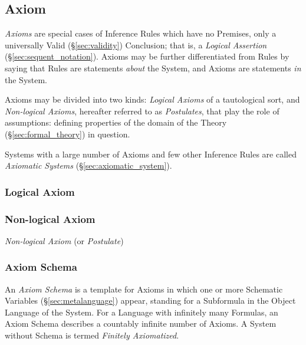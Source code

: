 \subsection{Axiom}\label{sec:axiom}

\emph{Axioms} are special cases of Inference Rules which have no
Premises, only a universally Valid (\S\ref{sec:validity}) Conclusion;
that is, a \emph{Logical Assertion} (\S\ref{sec:sequent_notation}).
Axioms may be further differentiated from Rules by saying that Rules
are statements \emph{about} the System, and Axioms are statements
\emph{in} the System.

Axioms may be divided into two kinds: \emph{Logical Axioms} of a
tautological sort, and \emph{Non-logical Axioms}, hereafter referred
to as \emph{Postulates}, that play the role of assumptions: defining
properties of the domain of the Theory (\S\ref{sec:formal_theory}) in
question.

Systems with a large number of Axioms and few other Inference Rules
are called \emph{Axiomatic Systems} (\S\ref{sec:axiomatic_system}).



\subsubsection{Logical Axiom}\label{sec:logical_axiom}



\subsubsection{Non-logical Axiom}\label{sec:nonlogical_axiom}

\emph{Non-logical Axiom} (or \emph{Postulate})



\subsubsection{Axiom Schema}\label{sec:axiom_schema}

An \emph{Axiom Schema} is a template for Axioms in which one or more
Schematic Variables (\S\ref{sec:metalanguage}) appear, standing for a
Subformula in the Object Language of the System. For a Language with
infinitely many Formulas, an Axiom Schema describes a countably infinite
number of Axioms. A System without Schema is termed \emph{Finitely
  Axiomatized}.



